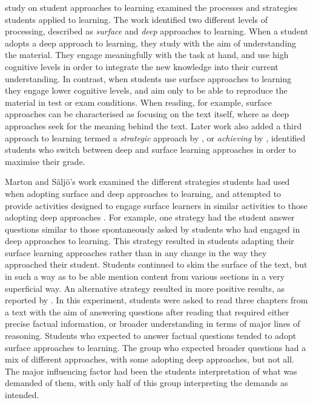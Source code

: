\citet{Marton:1976a, Marton:1976b,Marton:2005} study on student approaches to learning examined the processes and strategies students applied to learning. The work identified two different levels of processing, described as \emph{surface} and \emph{deep} approaches to learning. When a student adopts a deep approach to learning, they study with the aim of understanding the material. They engage meaningfully with the task at hand, and use high cognitive levels in order to integrate the new knowledge into their current understanding. In contrast, when students use surface approaches to learning they engage lower cognitive levels, and aim only to be able to reproduce the material in test or exam conditions. When reading, for example, surface approaches can be characterised as focusing on the text itself, where as deep approaches seek for the meaning behind the text. Later work also added a third approach to learning termed a \emph{strategic} approach by \citet{Ramsden:1983}, or \emph{achieving} by  \citet{Biggs:1987}, identified students who switch between deep and surface learning approaches in order to maximise their grade. 

Marton and S\"{a}lj\"{o}'s work examined the different strategies students had used when adopting surface and deep approaches to learning, and attempted to provide activities designed to engage surface learners in similar activities to those adopting deep approaches \cite{Marton:2005}. For example, one strategy had the student answer questions similar to those spontaneously asked by students who had engaged in deep approaches to learning.  This strategy resulted in students adapting their surface learning approaches rather than in any change in the way they approached their student. Students continued to skim the surface of the text, but in such a way as to be able mention content from various sections in a very superficial way. An alternative strategy resulted in more positive results, as reported by \cite{Marton:1976b}. In this experiment, students were asked to read three chapters from a text with the aim of answering questions after reading that required either precise factual information, or broader understanding in terms of major lines of reasoning. Students who expected to answer factual questions tended to adopt surface approaches to learning. The group who expected broader questions had a mix of different approaches, with some adopting deep approaches, but not all. The major influencing factor had been the students interpretation of what was demanded of them, with only half of this group interpreting the demands as intended. 


